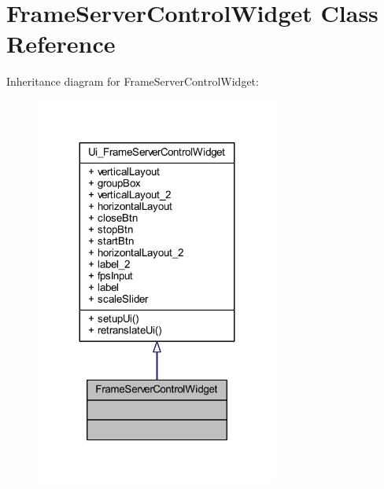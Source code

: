 \hypertarget{class_ui_1_1_frame_server_control_widget}{}\section{Frame\+Server\+Control\+Widget Class Reference}
\label{class_ui_1_1_frame_server_control_widget}


Inheritance diagram for Frame\+Server\+Control\+Widget\+:
\nopagebreak
\begin{figure}[H]
\begin{center}
\leavevmode
\includegraphics[width=227pt]{class_ui_1_1_frame_server_control_widget__inherit__graph}
\end{center}
\end{figure}


